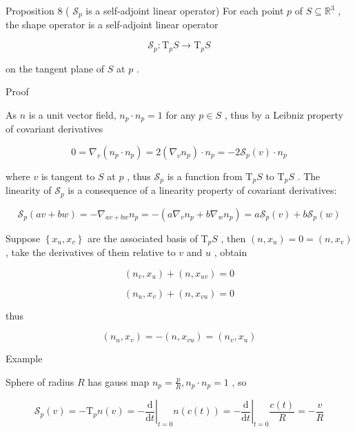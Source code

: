 \documentclass[lang=cn,a4paper,11pt,openany,twoside]{elegantbook}
\begin{document}
Proposition 8 ( \({\mathcal{S}}_{p}\) is a self-adjoint linear operator) For each point \(p\) of \(S \subseteq  {\mathbb{R}}^{3}\) , the shape operator is a self-adjoint linear operator

\[
{\mathcal{S}}_{p} : {\mathrm{T}}_{p}S \rightarrow  {\mathrm{T}}_{p}S
\]

on the tangent plane of \(S\) at \(p\) .

Proof

As \(n\) is a unit vector field, \({n}_{p} \cdot  {n}_{p} = 1\) for any \(p \in  S\) , thus by a Leibniz property of covariant derivatives

\[
0 = {\nabla }_{v}\left( {{n}_{p} \cdot  {n}_{p}}\right)  = 2\left( {{\nabla }_{v}{n}_{p}}\right)  \cdot  {n}_{p} =  - 2{\mathcal{S}}_{p}\left( v\right)  \cdot  {n}_{p}
\]

where \(v\) is tangent to \(S\) at \(p\) , thus \({\mathcal{S}}_{p}\) is a function from \({\mathrm{T}}_{p}S\) to \({\mathrm{T}}_{p}S\) . The linearity of \({\mathcal{S}}_{p}\) is a consequence of a linearity property of covariant derivatives:

\[
{\mathcal{S}}_{p}\left( {{av} + {bw}}\right)  =  - {\nabla }_{{av} + {bw}}{n}_{p} =  - \left( {a{\nabla }_{v}{n}_{p} + b{\nabla }_{w}{n}_{p}}\right)  = a{\mathcal{S}}_{p}\left( v\right)  + b{\mathcal{S}}_{p}\left( w\right)
\]

Suppose \(\left\{  {{x}_{u},{x}_{v}}\right\}\) are the associated basis of \({\mathrm{T}}_{p}S\) , then \(\left( {n,{x}_{u}}\right)  = 0 = \left( {n,{x}_{v}}\right)\) , take the derivatives of them relative to \(v\) and \(u\) , obtain

\[
\left( {{n}_{v},{x}_{u}}\right)  + \left( {n,{x}_{uv}}\right)  = 0
\]

\[
\left( {{n}_{u},{x}_{v}}\right)  + \left( {n,{x}_{vu}}\right)  = 0
\]

thus

\[
\left( {{n}_{u},{x}_{v}}\right)  =  - \left( {n,{x}_{vu}}\right)  = \left( {{n}_{v},{x}_{u}}\right)
\]

Example

Sphere of radius \(R\) has gauss map \({n}_{p} = \frac{p}{R},{n}_{p} \cdot  {n}_{p} = 1\) , so

\[
{\mathcal{S}}_{p}\left( v\right)  =  - {\mathrm{T}}_{p}n\left( v\right)  =  - {\left. \frac{\mathrm{d}}{\mathrm{d}t}\right| }_{t = 0}n\left( {c\left( t\right) }\right)  =  - {\left. \frac{\mathrm{d}}{\mathrm{d}t}\right| }_{t = 0}\frac{c\left( t\right) }{R} =  - \frac{v}{R}
\]
\end{document}
